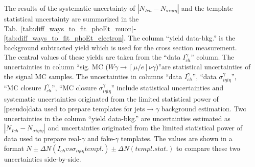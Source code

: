 The results of the systematic uncertainty of $|N_{Ich}-N_{\sigma i\eta i\eta}|$ and the template statistical uncertainty are summarized in the Tab.~\ref{tab:diff_ways_to_fit_phoEt_muon}-\ref{tab:diff_ways_to_fit_phoEt_electron}. The column ``yield data-bkg.'' is the background subtracted yield which is used for the cross section measurement. The central values of these yields are taken from the ``data $I_{ch}^{\gamma}$'' column. The uncertainties in column ``sig. MC ($W\gamma\rightarrow[\mu/e]\nu\gamma$)''are statistical uncertainties of the signal MC samples. The uncertainties in columns ``data $I_{ch}^{\gamma}$'', ``data $\sigma_{i\eta i\eta}^\gamma$'', ``MC closure $I_{ch}^{\gamma}$'', ``MC closure $\sigma_{i\eta i\eta}^\gamma$'' include statistical uncertainties and systematic uncertainties originated from the limited statistical power of [pseudo]data used to prepare templates for jets$\rightarrow\gamma$ background estimation. Two uncertainties in the column ``yield data-bkg.'' are uncertainties estimated as $|N_{Ich}-N_{\sigma i\eta i\eta}|$ and uncertainties originated from the limited statistical power of data used to prepare real-$\gamma$ and fake-$\gamma$ templates. The values are shown in a format $N\pm\Delta N(I_{ch} vs \sigma_{i\eta i\eta} templ.)\pm \Delta N(templ. stat.)$ to compare these two uncertainties side-by-side.  %

